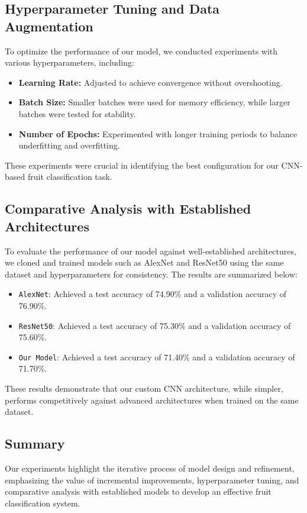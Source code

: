 \documentclass{article}
\begin{document}
\subsection{Hyperparameter Tuning and Data Augmentation}
To optimize the performance of our model, we conducted experiments with various hyperparameters, including:
\begin{itemize}
    \item \textbf{Learning Rate:} Adjusted to achieve convergence without overshooting.
    \item \textbf{Batch Size:} Smaller batches were used for memory efficiency, while larger batches were tested for stability.
    \item \textbf{Number of Epochs:} Experimented with longer training periods to balance underfitting and overfitting.
\end{itemize}

These experiments were crucial in identifying the best configuration for our CNN-based fruit classification task.

\subsection{Comparative Analysis with Established Architectures}
To evaluate the performance of our model against well-established architectures, we cloned and trained models such as AlexNet and ResNet50 using the same dataset and hyperparameters for consistency. The results are summarized below:
\begin{itemize}
    \item \texttt{AlexNet}: Achieved a test accuracy of 74.90\% and a validation accuracy of 76.90\%.
    \item \texttt{ResNet50}: Achieved a test accuracy of 75.30\% and a validation accuracy of 75.60\%.
    \item \texttt{Our Model}: Achieved a test accuracy of 71.40\% and a validation accuracy of 71.70\%.
\end{itemize}

These results demonstrate that our custom CNN architecture, while simpler, performs competitively against advanced architectures when trained on the same dataset. 

\subsection{Summary}
Our experiments highlight the iterative process of model design and refinement, emphasizing the value of incremental improvements, hyperparameter tuning, and comparative analysis with established models to develop an effective fruit classification system.
\end{document}
